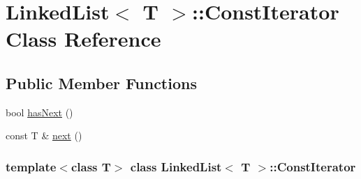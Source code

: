 \hypertarget{class_linked_list_1_1_const_iterator}{
\section{LinkedList$<$ T $>$::ConstIterator Class Reference}
\label{class_linked_list_1_1_const_iterator}
}
\subsection*{Public Member Functions}
\begin{DoxyCompactItemize}
\item 
bool \hyperlink{class_linked_list_1_1_const_iterator_a383fbbe1ec4fa02c46546b806c3a9264}{hasNext} ()
\item 
const T \& \hyperlink{class_linked_list_1_1_const_iterator_a12b0eac3af3c39233e9dabb7f6d5d4ae}{next} ()
\end{DoxyCompactItemize}
\subsubsection*{template$<$class T$>$ class LinkedList$<$ T $>$::ConstIterator}




